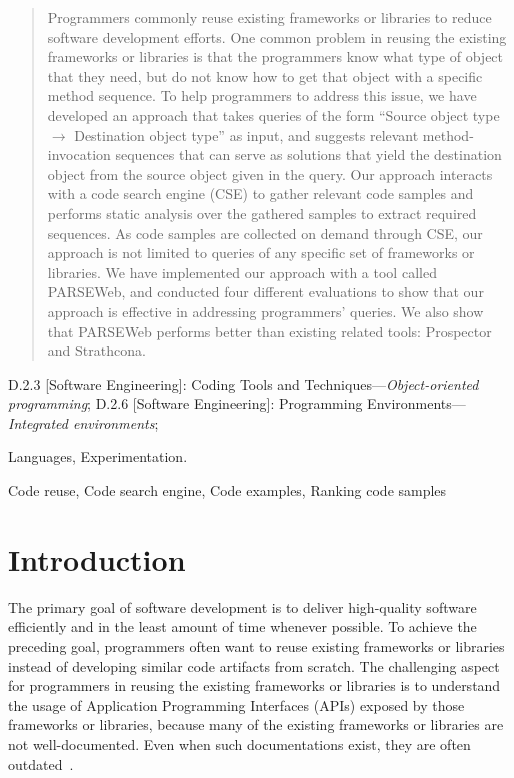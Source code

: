 \documentclass{fp035-thummalapenta}
\begin{document}
\begin{abstract}

Programmers commonly reuse existing frameworks or libraries to
reduce software development efforts. One common problem in reusing
the existing frameworks or libraries is that the programmers know what type
of object that they need, but do not know how to get that object
with a specific method sequence. To help programmers to address this
issue, we have developed an approach that takes queries of the form
``Source object type $\rightarrow$ Destination object type'' as
input, and suggests relevant method-invocation sequences that can
serve as solutions that yield the destination object from the source object 
given in the query. Our approach interacts with
a code search engine (CSE) to gather relevant code samples and
performs static analysis over the gathered samples to extract
required sequences. As code samples are collected on demand through
CSE, our approach is not limited to queries of any specific set of frameworks
or libraries. We have implemented our approach with a tool called
PARSEWeb, and conducted four different evaluations to show that our
approach is effective in addressing programmers' queries. We also
show that PARSEWeb performs better than existing related tools:
Prospector and Strathcona.

\end{abstract}

\vspace{1mm} 
D.2.3 {[Software Engineering]}: {Coding Tools and
Techniques---\emph{Object-oriented programming}}; D.2.6 {[Software Engineering]}: {Programming
Environments---\emph{Integrated environments}};

\vspace{1mm}  Languages,
Experimentation.

\vspace{1mm}  Code reuse, Code search
engine, Code examples, Ranking code samples

\section{Introduction}
\label{sec:introduction}

The primary goal of software development is to deliver high-quality
software efficiently and in the least amount of time whenever
possible. To achieve the preceding goal, programmers often want to
reuse existing frameworks or libraries instead of developing similar
code artifacts from scratch. The challenging aspect for
programmers in reusing the existing frameworks or libraries is to
understand the usage of Application Programming Interfaces (APIs)
exposed by those frameworks or libraries, because many of the
existing frameworks or libraries are not well-documented. Even when
such documentations exist, they are often outdated~\cite{document:leth}.
\end{document}

